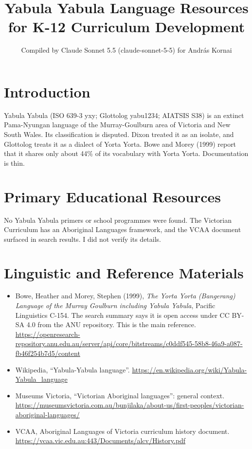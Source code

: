 \documentclass[12pt]{article}
\title{Yabula Yabula Language Resources for K-12 Curriculum Development}
\author{Compiled by Claude Sonnet 5.5 (claude-sonnet-5-5) for Andr\'as Kornai}
\date{}
\begin{document}
\maketitle

\section{Introduction}
Yabula Yabula (ISO 639-3 yxy; Glottolog yabu1234; AIATSIS S38) is an extinct Pama-Nyungan language of the Murray-Goulburn area of Victoria and New South Wales. Its classification is disputed. Dixon treated it as an isolate, and Glottolog treats it as a dialect of Yorta Yorta. Bowe and Morey (1999) report that it shares only about 44\% of its vocabulary with Yorta Yorta. Documentation is thin.

\section{Primary Educational Resources}
No Yabula Yabula primers or school programmes were found. The Victorian Curriculum has an Aboriginal Languages framework, and the VCAA document surfaced in search results. I did not verify its details.

\section{Linguistic and Reference Materials}
\begin{itemize}
\item Bowe, Heather and Morey, Stephen (1999), \emph{The Yorta Yorta (Bangerang) Language of the Murray Goulburn including Yabula Yabula}, Pacific Linguistics C-154. The search summary says it is open access under CC BY-SA 4.0 from the ANU repository. This is the main reference. \url{https://openresearch-repository.anu.edu.au/server/api/core/bitstreams/c0ddf545-58b8-46a9-a087-fb46f254b7d5/content}
\item Wikipedia, ``Yabula-Yabula language''. \url{https://en.wikipedia.org/wiki/Yabula-Yabula_language}
\item Museums Victoria, ``Victorian Aboriginal languages'': general context. \url{https://museumsvictoria.com.au/bunjilaka/about-us/first-peoples/victorian-aboriginal-languages/}
\item VCAA, Aboriginal Languages of Victoria curriculum history document. \url{https://vcaa.vic.edu.au:443/Documents/alcv/History.pdf}
\end{itemize}
\end{document}
